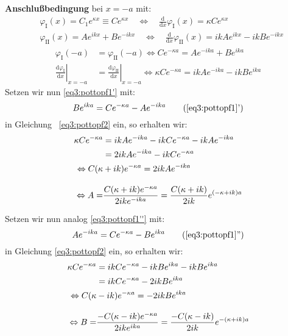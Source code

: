 \textbf{Anschlußbedingung} bei $x=-a$ mit:
\begin{align*}
   &\varphi_\text{I}(x) = C_1 e^{\kappa x} \equiv C e^{\kappa x} \quad
   \Leftrightarrow \quad \frac {\text{d}}{\text{d}x} \varphi_\text{I}(x) 
    = \kappa C e^{\kappa x}\\
   &\varphi_\text{II}(x) = A e^{i k x}+B e^{-i k x} \quad
   \Leftrightarrow \quad  \frac {\text{d}}{\text{d}x}\varphi_\text{II}(x) 
    = ik Ae^{ikx}-ikBe^{-ikx}
\end{align*}
\begin{align}
  \varphi_\textrm{I} (-a) &= \varphi_\textrm{II}(-a)
   \Leftrightarrow  
  Ce^{-\kappa a} = Ae^{-ika}+Be^{ika} \label{eq3:pottopf1}\\
  \left.\frac{\text{d}\varphi_{\text{I}}}{\text{d}x}\right|_{x=-a}
  &=\left.\frac{\text{d}\varphi_{\text{II}}}{\text{d}x}\right|_{x=-a}
   \Leftrightarrow  
   \kappa Ce^{-\kappa a} = ik Ae^{-ika}-ik Be^{ika}\label{eq3:pottopf2}
\end{align}
Setzen wir nun \eqref{eq3:pottopf1'} mit:
\begin{equation}
  \label{eq3:pottopf1'}
   Be^{ika}=Ce^{-\kappa a} - Ae^{-ika}\tag{\ref{eq3:pottopf1}'}
\end{equation}
in Gleichung~ \eqref{eq3:pottopf2} ein, so erhalten wir:
\begin{align}
   \kappa Ce^{-\kappa a} 
   &= ik Ae^{-ika}
      -ikCe^{-\kappa a} - ikAe^{-ika}\label{eq3:pottopf3}\\
   &=  2ikAe^{-ika} -ikCe^{-\kappa a}\notag\\
   \Leftrightarrow  C(\kappa&+ik) e^{-\kappa a}
   = 2ikAe^{-ika}\notag\\[2ex]
   \Leftrightarrow A 
   = &\frac{C(\kappa+ik)e^{-\kappa a}}
           {2ike^{-ika}}
    =\frac{C(\kappa+ik)}{2ik}e^{(-\kappa +ik)a}\notag
\end{align}

Setzen wir nun analog \eqref{eq3:pottopf1''} mit:
\begin{equation}
  \label{eq3:pottopf1''}
   Ae^{-ika}=Ce^{-\kappa a} - Be^{ika}\tag{\ref{eq3:pottopf1}''}
\end{equation}
in Gleichung \eqref{eq3:pottopf2} ein, so erhalten wir:
\begin{align}
   \kappa Ce^{-\kappa a} 
   &= ikCe^{-\kappa a} - ikBe^{ika}-ikBe^{ika}\label{eq3:pottopf4}\\
   &= ikCe^{-\kappa a}-2ikBe^{ika}\notag\\
   \Leftrightarrow  C(\kappa&-ik) e^{-\kappa a}
   = -2ikBe^{ika}\notag\\[2ex]
   \Leftrightarrow B 
   = &\frac{-C(\kappa-ik)e^{-\kappa a}}
           {2ike^{ika}}
    =\frac{-C(\kappa-ik)}{2ik}e^{-(\kappa +ik)a}\notag
\end{align}

